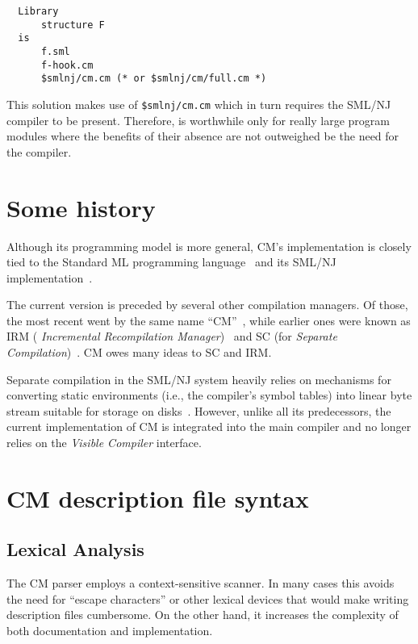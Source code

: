 \documentclass[titlepage,letterpaper]{article}
\begin{document}
\begin{verbatim}
  Library
      structure F
  is
      f.sml
      f-hook.cm
      $smlnj/cm.cm (* or $smlnj/cm/full.cm *)
\end{verbatim}

  This solution makes use of {\tt \$smlnj/cm.cm}
which in turn requires the SML/NJ compiler to be present.  Therefore,
is worthwhile only for really large program modules where the benefits
of their absence are not outweighed be the need for the compiler.

\section{Some history}

Although its programming model is more general, CM's implementation is
closely tied to the Standard ML programming language~\cite{milner97}
and its SML/NJ implementation~\cite{appel91:sml}.

The current version is preceded by several other compilation managers.
Of those, the most recent went by the same name
``CM''~\cite{blume95:cm}, while earlier ones were known as IRM ({\it
Incremental Recompilation Manager})~\cite{harper94:irm} and SC (for
{\it Separate Compilation})~\cite{harper-lee-pfenning-rollins-CM}.  CM
owes many ideas to SC and IRM.

Separate compilation in the SML/NJ system heavily relies on mechanisms
for converting static environments (i.e., the compiler's symbol
tables) into linear byte stream suitable for storage on
disks~\cite{appel94:sepcomp}.  However, unlike all its predecessors,
the current implementation of CM is integrated into the main compiler
and no longer relies on the {\em Visible Compiler} interface.

\pagebreak

\appendix

\section{CM description file syntax}

\subsection{Lexical Analysis}

The CM parser employs a context-sensitive scanner.  In many cases this
avoids the need for ``escape characters'' or other lexical devices
that would make writing description files cumbersome.  On the other
hand, it increases the complexity of both documentation and implementation.
\end{document}
